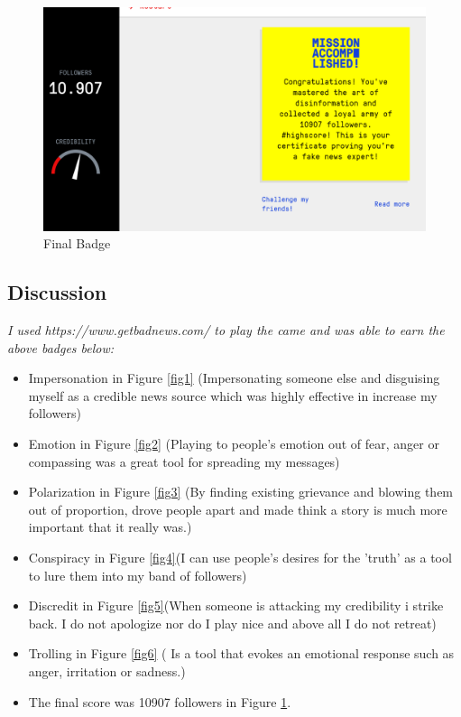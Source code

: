 \documentclass[12pt]{article}
\begin{document}
\clearpage
\begin{figure}[h]
    \centering
    \includegraphics[trim=0 0 0 0, clip, width=\textwidth] {Capture7.PNG}
    \caption{Final Badge}
    \label{fig7}
\end{figure}
\subsection*{Discussion}
\emph{I used https://www.getbadnews.com/ to play the came and was able to earn the above badges below:}
\begin{itemize}
\item Impersonation in Figure \ref{fig1} (Impersonating someone else and disguising myself as a credible news source which was highly effective in increase my followers)
\item Emotion in Figure \ref{fig2} (Playing to people's emotion out of fear, anger or compassing was a great tool for spreading my messages)
\item Polarization in Figure \ref{fig3} (By finding existing grievance and blowing them out of proportion, drove people apart and made think a story is much more important that it really was.)
\item Conspiracy in Figure \ref{fig4}(I can use people's desires for the 'truth' as a tool to lure them into my band of followers)
\item Discredit in Figure \ref{fig5}(When someone is attacking my credibility i strike back. I do not apologize nor do I play nice and above all I do not retreat)
\item Trolling in Figure \ref{fig6} ( Is a tool that evokes an emotional response such as anger, irritation or sadness.)
\item The final score was 10907 followers in Figure \ref{fig7}.
\end{itemize}
\end{document}
